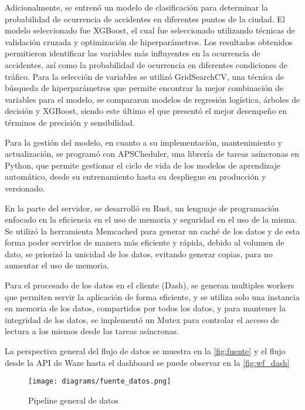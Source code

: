 \documentclass[12pt]{article}
\begin{document}
Adicionalmente, se entrenó un modelo de clasificación para determinar la probabilidad de ocurrencia de accidentes en diferentes puntos de la ciudad. El modelo seleccionado fue XGBoost, el cual fue seleccionado utilizando técnicas de validación cruzada y optimización de hiperparámetros. Los resultados obtenidos permitieron identificar las variables más influyentes en la ocurrencia de accidentes, así como la probabilidad de ocurrencia en diferentes condiciones de tráfico. Para la selección de variables se utilizó GridSearchCV, una técnica de búsqueda de hiperparámetros que permite encontrar la mejor combinación de variables para el modelo, se compararon modelos de regresión logística, árboles de decisión y XGBoost, siendo este último el que presentó el mejor desempeño en términos de precisión y sensibilidad.

Para la gestión del modelo, en cuanto a su implementación, mantenimiento y actualización, se programó con APSCheduler, una librería de tareas asíncronas en Python, que permite gestionar el ciclo de vida de los modelos de aprendizaje automático, desde su entrenamiento hasta su despliegue en producción y versionado.

En la parte del servidor, se desarrolló en Rust, un lenguaje de programación enfocado en la eficiencia en el uso de memoria y seguridad en el uso de la misma. Se utilizó la herramienta Memcached para generar un caché de los datos y de esta forma poder servirlos de manera más eficiente y rápida, debido al volumen de dato, se priorizó la unicidad de los datos, evitando generar copias, para no aumentar el uso de memoria.

Para el procesado de los datos en el cliente (Dash), se generan multiples workers que permiten servir la aplicación de forma eficiente, y se utiliza solo una instancia en memoria de los datos, compartidos por todos los datos, y para mantener la integridad de los datos, se implementó un Mutex para controlar el acceso de lectura a los mismos desde las tareas asíncronas.

La perspectiva general del flujo de datos se muestra en la \autoref{fig:fuente} y el flujo desde la API de Waze hasta el dashboard se puede observar en la \autoref{fig:wf_dash}

\begin{figure}[h]
    \centering
    \texttt{[image: diagrams/fuente\_datos.png]}
    \caption{Pipeline general de datos}
    \label{fig:fuente}
\end{figure}
\end{document}
